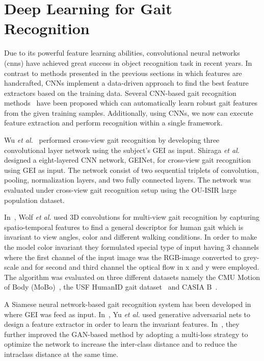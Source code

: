 \section{Deep Learning for Gait Recognition} \label{sec:deep_learning_gait_rec}
Due to its powerful feature learning abilities, convolutional neural networks (\gls{cnn}s) have achieved great success in object recognition task in recent years. In contrast to methods presented in the previous sections in which features are handcrafted, CNNs implement a data-driven approach to find the best feature extractors based on the training data. Several CNN-based gait recognition methods~\cite{Wu_17, Shiraga_16, Wolf_16, Zhang_16, Yu_17, Yu_19} have been proposed which can automatically learn robust gait features from the given training samples. Additionally, using CNNs, we now can execute feature extraction and perform recognition within a single framework. 

Wu \textit{et al.}~\cite{Wu_17} performed cross-view gait recognition by developing three convolutional layer network using the subject's GEI as input. Shiraga \textit{et al.}~\cite{Shiraga_16} designed a eight-layered CNN network, GEINet, for cross-view gait recognition using GEI as input. The network consist of two sequential triplets of convolution, pooling, normalization layers, and two fully connected layers. The network was evaluated under cross-view gait recognition setup using the OU-ISIR large population dataset.


In~\cite{Wolf_16}, Wolf \textit{et al.} used 3D convolutions for multi-view gait recognition by capturing spatio-temporal features to find a general descriptor for human gait which is invariant to view angles, color and different walking conditions. In order to make the model color invariant they formulated special type of input having 3 channels where the first channel of the input image was the RGB-image converted to grey-scale and for second and third channel the optical flow in x and y were employed. The algorithm was evaluated on three different datasets namely the CMU Motion of Body (MoBo)~\cite{Gross_01}, the USF HumanID gait dataset~\cite{Sarkar_05} and CASIA B~\cite{Yu_06}.

A Siamese neural network-based gait recognition system has been developed in~\cite{Zhang_16} where GEI was feed as input. In~\cite{Yu_17}, Yu \textit{et al.} used generative adversarial nets to design a feature extractor in order to learn the invariant features. In~\cite{Yu_19}, they further improved the GAN-based method by adopting a multi-loss strategy to optimize the network to increase the inter-class distance and to reduce the intraclass distance at the same time.


